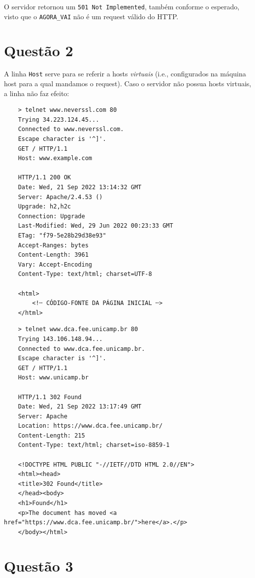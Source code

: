 \documentclass{article}
\begin{document}
O servidor retornou um \texttt{501 Not Implemented}, também conforme o esperado, visto que o \texttt{AGORA\_VAI} não é um request válido do HTTP.

\section*{Questão 2}
A linha \texttt{Host} serve para se referir a hosts \textit{virtuais} (i.e., configurados na máquina host para a qual mandamos o request). Caso o servidor não possua hosts virtuais, a linha não faz efeito:

\begin{verbatim}
    > telnet www.neverssl.com 80
    Trying 34.223.124.45...
    Connected to www.neverssl.com.
    Escape character is '^]'.
    GET / HTTP/1.1
    Host: www.example.com

    HTTP/1.1 200 OK
    Date: Wed, 21 Sep 2022 13:14:32 GMT
    Server: Apache/2.4.53 ()
    Upgrade: h2,h2c
    Connection: Upgrade
    Last-Modified: Wed, 29 Jun 2022 00:23:33 GMT
    ETag: "f79-5e28b29d38e93"
    Accept-Ranges: bytes
    Content-Length: 3961
    Vary: Accept-Encoding
    Content-Type: text/html; charset=UTF-8

    <html>
        <!╌ CÓDIGO-FONTE DA PÁGINA INICIAL ╌>
    </html>
\end{verbatim}

\begin{verbatim}
    > telnet www.dca.fee.unicamp.br 80
    Trying 143.106.148.94...
    Connected to www.dca.fee.unicamp.br.
    Escape character is '^]'.
    GET / HTTP/1.1
    Host: www.unicamp.br

    HTTP/1.1 302 Found
    Date: Wed, 21 Sep 2022 13:17:49 GMT
    Server: Apache
    Location: https://www.dca.fee.unicamp.br/
    Content-Length: 215
    Content-Type: text/html; charset=iso-8859-1

    <!DOCTYPE HTML PUBLIC "-//IETF//DTD HTML 2.0//EN">
    <html><head>
    <title>302 Found</title>
    </head><body>
    <h1>Found</h1>
    <p>The document has moved <a href="https://www.dca.fee.unicamp.br/">here</a>.</p>
    </body></html>
\end{verbatim}

\section*{Questão 3}
\end{document}
